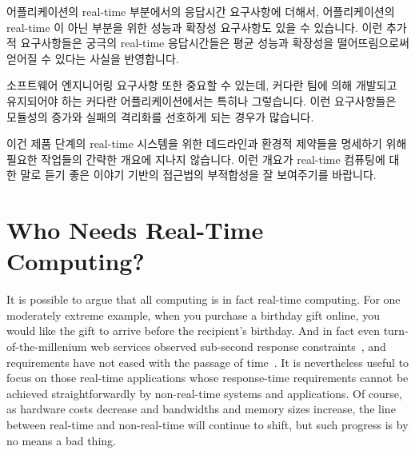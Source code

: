 어플리케이션의 real-time 부분에서의 응답시간 요구사항에 더해서, 어플리케이션의
real-time 이 아닌 부분을 위한 성능과 확장성 요구사항도 있을 수 있습니다.
이런 추가적 요구사항들은 궁극의 real-time 응답시간들은 평균 성능과 확장성을
떨어뜨림으로써 얻어질 수 있다는 사실을 반영합니다.

소프트웨어 엔지니어링 요구사항 또한 중요할 수 있는데, 커다란 팀에 의해 개발되고
유지되어야 하는 커다란 어플리케이션에서는 특히나 그렇습니다.
이런 요구사항들은 모듈성의 증가와 실패의 격리화를 선호하게 되는 경우가
많습니다.

이건 제품 단계의 real-time 시스템을 위한 데드라인과 환경적 제약들을 명세하기
위해 필요한 작업들의 간략한 개요에 지나지 않습니다.
이런 개요가 real-time 컴퓨팅에 대한 말로 듣기 좋은 이야기 기반의 접근법의
부적합성을 잘 보여주기를 바랍니다.

\section{Who Needs Real-Time Computing?}
\label{sec:rt:Who Needs Real-Time Computing?}

It is possible to argue that all computing is in fact real-time computing.
For one moderately extreme example, when you purchase a birthday gift online,
you would like the gift to arrive before the recipient's birthday.
And in fact even turn-of-the-millenium web services observed sub-second
response constraints~\cite{KristofferBohmann2001a}, and requirements have
not eased with the passage of time~\cite{DeCandia:2007:DAH:1323293.1294281}.
It is nevertheless useful to focus on those real-time applications
whose response-time requirements cannot be achieved straightforwardly
by non-real-time systems and applications.
Of course, as hardware costs decrease and bandwidths and memory sizes
increase, the line between real-time and non-real-time will continue
to shift, but such progress is by no means a bad thing.

